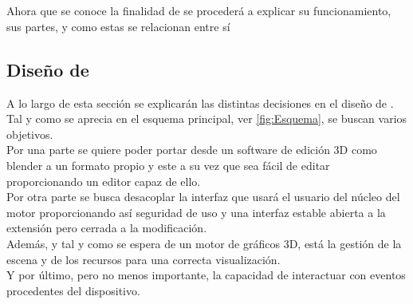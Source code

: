 

\newlength\myframesep
\setlength\myframesep{8pt}



\newcommand\widernode[5][blueb]{
\node[
        #1,
        inner sep=0pt,
        shift=($(#2.south)-(#2.north)$),
        yshift=-\pgfkeysvalueof{/tikz/node distance value},
        fit={(#2) (#3)},
        label=center:{\sffamily\bfseries\color{white}#4}] (#5) {};
}

\chapter{\robotto} %

\label{Chapter2} %



Ahora que se conoce la finalidad de \robotto se procederá a explicar su funcionamiento, sus partes, y como estas se relacionan entre sí

\section{Diseño de \robotto}

A lo largo de esta sección se explicarán las distintas decisiones en el diseño de \robotto. Tal y como se aprecia en el esquema principal, ver \ref{fig:Esquema}, se buscan varios objetivos.\\
Por una parte se quiere poder portar desde un software de edición 3D como blender a un formato propio y este a su vez que sea fácil de editar proporcionando un editor capaz de ello. \\
Por otra parte se busca desacoplar la interfaz que usará el usuario del núcleo del motor proporcionando así seguridad de uso y una interfaz estable abierta a la extensión pero cerrada a la modificación.\\
Además, y tal y como se espera de un motor de gráficos 3D, está la gestión de la escena y de los recursos para una correcta visualización.\\
Y por último, pero no menos importante, la capacidad de interactuar con eventos procedentes del dispositivo.\\

